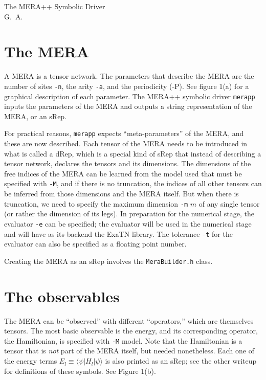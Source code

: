\documentclass{article}
\newcommand{\code}[1]{\texttt{#1}}
\begin{document}
	\begin{center}
		{\LARGE The MERA++ Symbolic Driver}\vspace{0.5cm}\\
		
	{G.~A.}
	
\end{center}

\section{The MERA}
	A MERA is a tensor network. The parameters that describe the MERA
	are the number of sites \code{-n}, the arity \code{-a}, and the periodicity (-P).
See figure 1(a) for a graphical description of each parameter.
The MERA++ symbolic driver \code{merapp} inputs the parameters of the MERA and
outputs a string representation of the MERA, or an sRep.

For practical reasons, \code{merapp} expects ``meta-parameters'' of the MERA, and these
are now described. Each tensor of the MERA needs to be introduced in what is called a dRep, which
is a special kind of sRep that instead of describing a tensor network, declares
the tensors and its dimensions. The dimensions of the free indices of the MERA
can be learned from the model used that must be specified with \code{-M}, and if there is no truncation, the indices of all
other tensors can be inferred from those dimensions and the MERA itself. 
But when there is truncation, we need to specify the maximum dimension  \code{-m} $m$
of any single tensor (or rather
the dimension of its legs). In preparation for the numerical stage, the evaluator \code{-e} can be specified;
the evaluator will be used in the numerical stage and will have as its backend the ExaTN library.
The tolerance \code{-t} for the evaluator can also be specified as a floating point number.

Creating the MERA as an sRep involves the \code{MeraBuilder.h} class.

\section{The observables}
The MERA can be ``observed'' with different ``operators,'' which are themselves tensors.
The most basic observable is the energy, and its corresponding operator, the Hamiltonian, is specified
with \code{-M} model. Note that the Hamiltonian is a tensor that is \emph{not} part of the MERA itself, but needed nonetheless.
Each one of the energy terms $E_l\equiv \langle \psi | H_l |\psi\rangle$ is also printed as an sRep; see the other writeup for definitions of these symbols.
See Figure 1(b).
\end{document}
